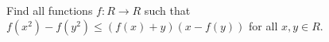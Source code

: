 Find all functions $f : R \to  R$ such that $f(x^2)-f(y^2) \le   (f(x)+y) (x-f(y))$ for all $x, y \in  R$.
